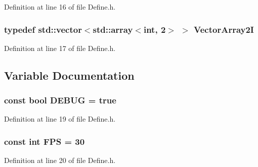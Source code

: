 \-Definition at line 16 of file \-Define.\-h.

\subsubsection[{\-Vector\-Array2\-I}]{\setlength{\rightskip}{0pt plus 5cm}typedef std\-::vector$<$std\-::array$<$int, 2$>$ $>$ {\bf \-Vector\-Array2\-I}}\label{_define_8h_a68809cd5f56d76e3b5e3ec23918e3260}


\-Definition at line 17 of file \-Define.\-h.



\subsection{\-Variable \-Documentation}
\subsubsection[{\-D\-E\-B\-U\-G}]{\setlength{\rightskip}{0pt plus 5cm}const bool {\bf \-D\-E\-B\-U\-G} = true}\label{_define_8h_a9c4ab189c2f018bc7ccc8ba4f6e04b9d}


\-Definition at line 19 of file \-Define.\-h.

\subsubsection[{\-F\-P\-S}]{\setlength{\rightskip}{0pt plus 5cm}const int {\bf \-F\-P\-S} = 30}\label{_define_8h_ac5090a6568797128b0a5545228bb8b75}


\-Definition at line 20 of file \-Define.\-h.

